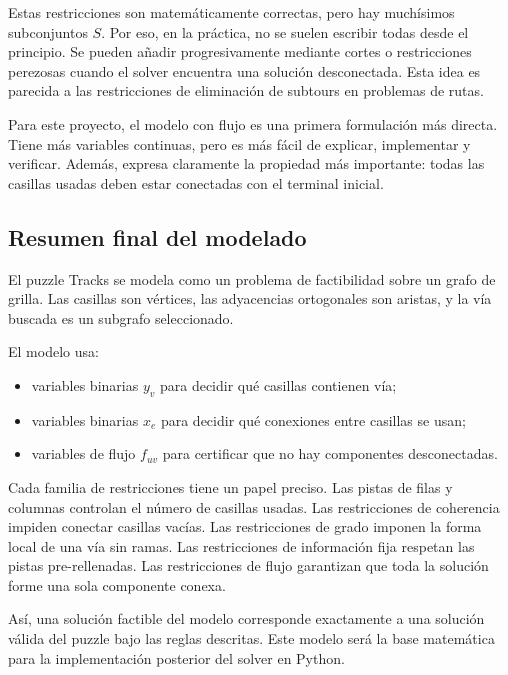 Estas restricciones son matemáticamente correctas, pero hay muchísimos subconjuntos \(S\). Por eso, en la práctica, no se suelen escribir todas desde el principio. Se pueden añadir progresivamente mediante cortes o restricciones perezosas cuando el solver encuentra una solución desconectada. Esta idea es parecida a las restricciones de eliminación de subtours en problemas de rutas.

Para este proyecto, el modelo con flujo es una primera formulación más directa. Tiene más variables continuas, pero es más fácil de explicar, implementar y verificar. Además, expresa claramente la propiedad más importante: todas las casillas usadas deben estar conectadas con el terminal inicial.

\subsection{Resumen final del modelado}

El puzzle Tracks se modela como un problema de factibilidad sobre un grafo de grilla. Las casillas son vértices, las adyacencias ortogonales son aristas, y la vía buscada es un subgrafo seleccionado.

El modelo usa:
\begin{itemize}[leftmargin=2em]
    \item variables binarias \(y_v\) para decidir qué casillas contienen vía;
    \item variables binarias \(x_e\) para decidir qué conexiones entre casillas se usan;
    \item variables de flujo \(f_{uv}\) para certificar que no hay componentes desconectadas.
\end{itemize}

Cada familia de restricciones tiene un papel preciso. Las pistas de filas y columnas controlan el número de casillas usadas. Las restricciones de coherencia impiden conectar casillas vacías. Las restricciones de grado imponen la forma local de una vía sin ramas. Las restricciones de información fija respetan las pistas pre-rellenadas. Las restricciones de flujo garantizan que toda la solución forme una sola componente conexa.

Así, una solución factible del modelo corresponde exactamente a una solución válida del puzzle bajo las reglas descritas. Este modelo será la base matemática para la implementación posterior del solver en Python.

